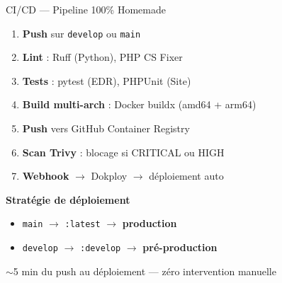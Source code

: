 \documentclass[xcolor=dvipsnames, aspectratio=169, 10pt]{beamer}
\newcommand{\bitem}{\item[$\bullet$]}
\begin{document}
\begin{frame}{CI/CD — Pipeline 100\% Homemade}
  \begin{enumerate}
    \item \textbf{Push} sur \texttt{develop} ou \texttt{main}
    \item \textbf{Lint} : Ruff (Python), PHP CS Fixer
    \item \textbf{Tests} : pytest (EDR), PHPUnit (Site)
    \item \textbf{Build multi-arch} : Docker buildx (amd64 + arm64)
    \item \textbf{Push} vers GitHub Container Registry
    \item \textbf{Scan Trivy} : blocage si CRITICAL ou HIGH
    \item \textbf{Webhook} $\rightarrow$ Dokploy $\rightarrow$ déploiement auto
  \end{enumerate}
  \vspace{0.3cm}
  \textbf{Stratégie de déploiement}
  \begin{itemize}
    \bitem \texttt{main} $\rightarrow$ \texttt{:latest} $\rightarrow$ \textbf{production}
    \bitem \texttt{develop} $\rightarrow$ \texttt{:develop} $\rightarrow$ \textbf{pré-production}
  \end{itemize}
  \begin{exampleblock}{$\sim$5 min du push au déploiement — zéro intervention manuelle}
  \end{exampleblock}
\end{frame}
\end{document}
